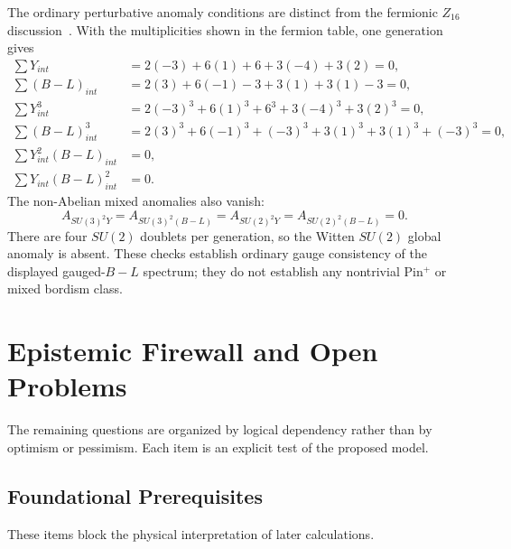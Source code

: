 \documentclass[11pt]{article}
\theoremstyle{canonmath}
\theoremstyle{canonpostulate}
\theoremstyle{canonclaim}
\def\mathrm#1{#1}%
\def\mathbb#1{#1}%
\def\mathcal#1{#1}%
\begin{document}
The ordinary perturbative anomaly conditions are distinct from the fermionic $\mathbb Z_{16}$ discussion~\cite{Davighi}. With the multiplicities shown in the fermion table, one generation gives
\begin{align}
\sum Y_{\mathrm{int}}&=2(-3)+6(1)+6+3(-4)+3(2)=0,\\
\sum (B-L)_{\mathrm{int}}&=2(3)+6(-1)-3+3(1)+3(1)-3=0,\\
\sum Y_{\mathrm{int}}^3&=2(-3)^3+6(1)^3+6^3+3(-4)^3+3(2)^3=0,\\
\sum (B-L)_{\mathrm{int}}^3&=2(3)^3+6(-1)^3+(-3)^3+3(1)^3+3(1)^3+(-3)^3=0,\\
\sum Y_{\mathrm{int}}^2(B-L)_{\mathrm{int}}&=0,\\
\sum Y_{\mathrm{int}}(B-L)_{\mathrm{int}}^2&=0.
\end{align}
The non-Abelian mixed anomalies also vanish:
\begin{equation}
\mathcal A_{SU(3)^2Y}=\mathcal A_{SU(3)^2(B-L)}
=\mathcal A_{SU(2)^2Y}=\mathcal A_{SU(2)^2(B-L)}=0.
\end{equation}
There are four $SU(2)$ doublets per generation, so the Witten $SU(2)$ global anomaly is absent. These checks establish ordinary gauge consistency of the displayed gauged-$B-L$ spectrum; they do not establish any nontrivial Pin$^+$ or mixed bordism class.

\section{Epistemic Firewall and Open Problems}
\label{sec:firewall}

The remaining questions are organized by logical dependency rather than by optimism or pessimism. Each item is an explicit test of the proposed model.

\subsection*{Foundational Prerequisites}
These items block the physical interpretation of later calculations.
\end{document}
